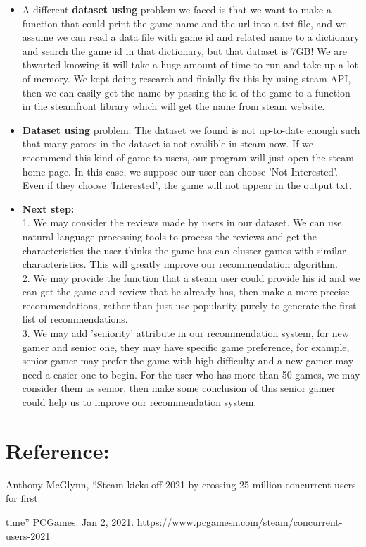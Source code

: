 \documentclass{article}
\begin{document}
\begin{itemize}
    \item A different \textbf{dataset using} problem we faced is that we want to make a function that could print the game name and the url into a txt file, and we assume we can read a data file with game id and related name to a dictionary and search the game id in that dictionary, but that dataset is 7GB! We are thwarted knowing it will take a huge amount of time to run and take up a lot of memory. We kept doing research and finially fix this by using steam API, then we can easily get the name by passing the id of the game to a function in the steamfront library which will get the name from steam website.
    \item \textbf{Dataset using} problem: The dataset we found is not up-to-date enough such that many games in the dataset is not availible in steam now. If we recommend this kind of game to users, our program will just open the steam home page. In this case, we suppose our user can choose 'Not Interested'. Even if they choose 'Interested', the game will not appear in the output txt.
    \item \textbf{Next step:} \\1. We may consider the reviews made by users in our dataset. We can use natural language processing tools to process the reviews and get the characteristics the user thinks the game has can cluster games with similar characteristics. This will greatly improve our recommendation algorithm.\\
    2. We may provide the function that a steam user could provide his id and we can get the game and review that he already has, then make a more precise recommendations, rather than just use popularity purely to generate the first list of recommendations.\\
    3. We may add 'seniority' attribute in our recommendation system, for new gamer and senior one, they may have specific game preference, for example, senior gamer may prefer the game with high difficulty and a new gamer may need a easier one to begin. For the user who has more than 50 games, we may consider them as senior, then make some conclusion of this senior gamer could help us to improve our recommendation system.\\
\end{itemize}
\section{Reference:}

\noindent
Anthony McGlynn, “Steam kicks off 2021 by crossing 25 million concurrent users for first \par
\setlength{\parindent}{6ex}
time” PCGames. Jan 2, 2021. \url{https://www.pcgamesn.com/steam/concurrent-users-2021}\\
\end{document}
